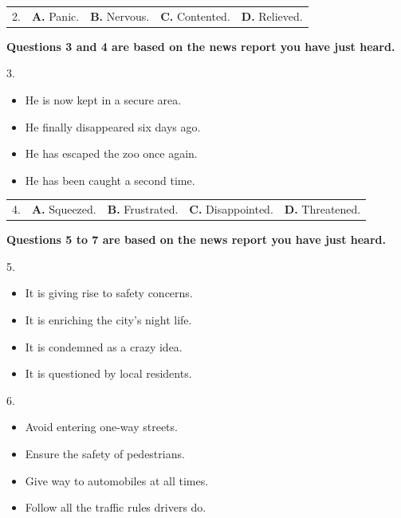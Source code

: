 \documentclass[UTF8,11pt]{ctexart}
\begin{document}
\noindent\begin{tabularx}{\linewidth}{@{}lXXXX@{}}2. & \textbf{A.} Panic. & \textbf{B.} Nervous. & \textbf{C.} Contented. & \textbf{D.} Relieved.\\\end{tabularx}\par

\textbf{Questions 3 and 4 are based on the news report you have just heard.}


3.


\begin{itemize}[leftmargin=2em,itemsep=.2em,topsep=.4em]\item[A.] He is now kept in a secure area.
\item[B.] He finally disappeared six days ago.
\item[C.] He has escaped the zoo once again.
\item[D.] He has been caught a second time.
\end{itemize}

\noindent\begin{tabularx}{\linewidth}{@{}lXXXX@{}}4. & \textbf{A.} Squeezed. & \textbf{B.} Frustrated. & \textbf{C.} Disappointed. & \textbf{D.} Threatened.\\\end{tabularx}\par

\textbf{Questions 5 to 7 are based on the news report you have just heard.}


5.


\begin{itemize}[leftmargin=2em,itemsep=.2em,topsep=.4em]\item[A.] It is giving rise to safety concerns.
\item[B.] It is enriching the city’s night life.
\item[C.] It is condemned as a crazy idea.
\item[D.] It is questioned by local residents.
\end{itemize}

6.


\begin{itemize}[leftmargin=2em,itemsep=.2em,topsep=.4em]\item[A.] Avoid entering one-way streets.
\item[B.] Ensure the safety of pedestrians.
\item[C.] Give way to automobiles at all times.
\item[D.] Follow all the traffic rules drivers do.
\end{itemize}
\end{document}
